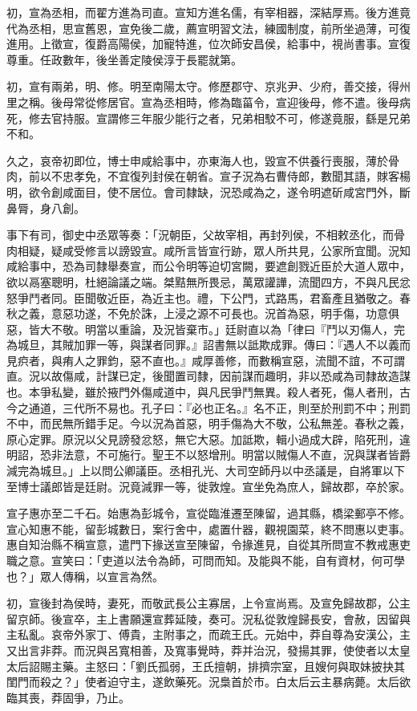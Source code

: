 \begin{pinyinscope}
初，宣為丞相，而翟方進為司直。宣知方進名儒，有宰相器，深結厚焉。後方進竟代為丞相，思宣舊恩，宣免後二歲，薦宣明習文法，練國制度，前所坐過薄，可復進用。上徵宣，復爵高陽侯，加寵特進，位次師安昌侯，給事中，視尚書事。宣復尊重。任政數年，後坐善定陵侯淳于長罷就第。

初，宣有兩弟，明、修。明至南陽太守。修歷郡守、京兆尹、少府，善交接，得州里之稱。後母常從修居官。宣為丞相時，修為臨菑令，宣迎後母，修不遣。後母病死，修去官持服。宣謂修三年服少能行之者，兄弟相駮不可，修遂竟服，繇是兄弟不和。

久之，哀帝初即位，博士申咸給事中，亦東海人也，毀宣不供養行喪服，薄於骨肉，前以不忠孝免，不宜復列封侯在朝省。宣子況為右曹侍郎，數聞其語，賕客楊明，欲令創咸面目，使不居位。會司隸缺，況恐咸為之，遂令明遮斫咸宮門外，斷鼻脣，身八創。

事下有司，御史中丞眾等奏：「況朝臣，父故宰相，再封列侯，不相敕丞化，而骨肉相疑，疑咸受修言以謗毀宣。咸所言皆宣行跡，眾人所共見，公家所宜聞。況知咸給事中，恐為司隸舉奏宣，而公令明等迫切宮闕，要遮創戮近臣於大道人眾中，欲以鬲塞聰明，杜絕論議之端。桀黠無所畏忌，萬眾讙譁，流聞四方，不與凡民忿怒爭鬥者同。臣聞敬近臣，為近主也。禮，下公門，式路馬，君畜產且猶敬之。春秋之義，意惡功遂，不免於誅，上浸之源不可長也。況首為惡，明手傷，功意俱惡，皆大不敬。明當以重論，及況皆棄市。」廷尉直以為「律曰『鬥以刃傷人，完為城旦，其賊加罪一等，與謀者同罪。』詔書無以詆欺成罪。傳曰：『遇人不以義而見疻者，與痏人之罪鈞，惡不直也。』咸厚善修，而數稱宣惡，流聞不誼，不可謂直。況以故傷咸，計謀已定，後聞置司隸，因前謀而趣明，非以恐咸為司隸故造謀也。本爭私變，雖於掖門外傷咸道中，與凡民爭鬥無異。殺人者死，傷人者刑，古今之通道，三代所不易也。孔子曰：『必也正名。』名不正，則至於刑罰不中；刑罰不中，而民無所錯手足。今以況為首惡，明手傷為大不敬，公私無差。春秋之義，原心定罪。原況以父見謗發忿怒，無它大惡。加詆欺，輯小過成大辟，陷死刑，違明詔，恐非法意，不可施行。聖王不以怒增刑。明當以賊傷人不直，況與謀者皆爵減完為城旦。」上以問公卿議臣。丞相孔光、大司空師丹以中丞議是，自將軍以下至博士議郎皆是廷尉。況竟減罪一等，徙敦煌。宣坐免為庶人，歸故郡，卒於家。

宣子惠亦至二千石。始惠為彭城令，宣從臨淮遷至陳留，過其縣，橋梁郵亭不修。宣心知惠不能，留彭城數日，案行舍中，處置什器，觀視園菜，終不問惠以吏事。惠自知治縣不稱宣意，遣門下掾送宣至陳留，令掾進見，自從其所問宣不教戒惠吏職之意。宣笑曰：「吏道以法令為師，可問而知。及能與不能，自有資材，何可學也？」眾人傳稱，以宣言為然。

初，宣後封為侯時，妻死，而敬武長公主寡居，上令宣尚焉。及宣免歸故郡，公主留京師。後宣卒，主上書願還宣葬延陵，奏可。況私從敦煌歸長安，會赦，因留與主私亂。哀帝外家丁、傅貴，主附事之，而疏王氏。元始中，莽自尊為安漢公，主又出言非莽。而況與呂寬相善，及寬事覺時，莽并治況，發揚其罪，使使者以太皇太后詔賜主藥。主怒曰：「劉氏孤弱，王氏擅朝，排擠宗室，且嫂何與取妹披抉其閨門而殺之？」使者迫守主，遂飲藥死。況梟首於市。白太后云主暴病薨。太后欲臨其喪，莽固爭，乃止。


\end{pinyinscope}
